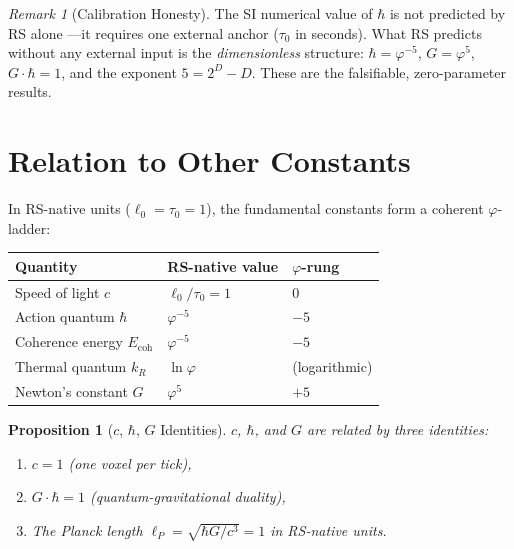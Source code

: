 \documentclass[12pt,a4paper]{article}
\newtheorem{proposition}[theorem]{Proposition}
\theoremstyle{definition}
\theoremstyle{remark}
\newtheorem{remark}[theorem]{Remark}
\begin{document}
\begin{remark}[Calibration Honesty]
The SI numerical value of $\hbar$ is not predicted by RS alone
---it requires one external anchor ($\tau_0$ in seconds).  What
RS predicts without any external input is the
\emph{dimensionless} structure: $\hbar = \varphi^{-5}$,
$G = \varphi^5$, $G \cdot \hbar = 1$, and the exponent
$5 = 2^D - D$.  These are the falsifiable, zero-parameter
results.
\end{remark}

\section{Relation to Other Constants}
\label{sec:relations}

In RS-native units ($\ell_0 = \tau_0 = 1$), the fundamental
constants form a coherent $\varphi$-ladder:
\begin{center}
\begin{tabular}{@{}lll@{}}
\toprule
\textbf{Quantity} & \textbf{RS-native value} &
\textbf{$\varphi$-rung} \\
\midrule
Speed of light $c$ & $\ell_0/\tau_0 = 1$ & 0 \\
Action quantum $\hbar$ & $\varphi^{-5}$ & $-5$ \\
Coherence energy $E_{\mathrm{coh}}$ & $\varphi^{-5}$ & $-5$ \\
Thermal quantum $k_R$ & $\ln\varphi$ & (logarithmic) \\
Newton's constant $G$ & $\varphi^5$ & $+5$ \\
\bottomrule
\end{tabular}
\end{center}

\begin{proposition}[$c$, $\hbar$, $G$ Identities]
\label{prop:cGhbar}
$c$, $\hbar$, and $G$ are related by three identities:
\begin{enumerate}[label=(\roman*),nosep]
  \item $c = 1$ (one voxel per tick),
  \item $G \cdot \hbar = 1$ (quantum-gravitational duality),
  \item The Planck length
  $\ell_P = \sqrt{\hbar G / c^3} = 1$ in RS-native units.
\end{enumerate}
\end{proposition}

\end{document}
